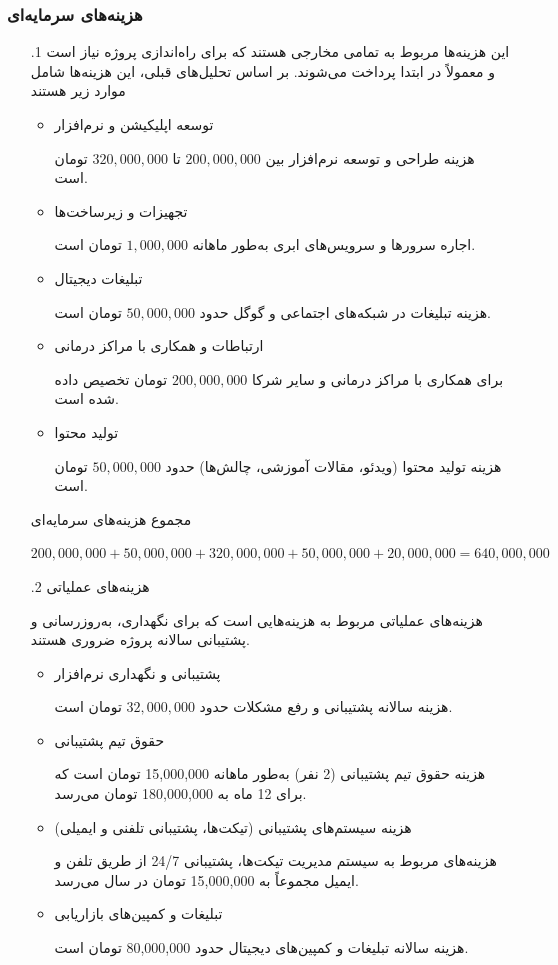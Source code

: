 \documentclass[dvipsnames, svgnames, x11names, 11pt]{article}
\begin{document}
\subsubsection{هزینه‌های سرمایه‌ای }
\begin{enumerate}
\item[\thesubsubsection.1]
این هزینه‌ها مربوط به تمامی مخارجی هستند که برای راه‌اندازی پروژه نیاز است و معمولاً در ابتدا پرداخت می‌شوند. بر اساس تحلیل‌های قبلی، این هزینه‌ها شامل موارد زیر هستند
\begin{itemize}
\item 
توسعه اپلیکیشن و نرم‌افزار

هزینه طراحی و توسعه نرم‌افزار بین
$200,000,000$
تا
$320,000,000$
تومان است.

\item 
تجهیزات و زیرساخت‌ها

اجاره سرورها و سرویس‌های ابری به‌طور ماهانه $1,000,000$ تومان است.

\item 
تبلیغات دیجیتال

هزینه تبلیغات در شبکه‌های اجتماعی و گوگل حدود $50,000,000$ تومان است.

\item 
ارتباطات و همکاری با مراکز درمانی

برای همکاری با مراکز درمانی و سایر شرکا
$200,000,000$
تومان تخصیص داده شده است.

\item 
تولید محتوا

هزینه تولید محتوا (ویدئو، مقالات آموزشی، چالش‌ها) حدود
$50,000,000$
تومان است.
\end{itemize}
مجموع هزینه‌های سرمایه‌ای

$200,000,000+50,000,000+320,000,000+50,000,000+20,000,000=640,000,000$

\item[\thesubsubsection.2]
هزینه‌های عملیاتی 

هزینه‌های عملیاتی مربوط به هزینه‌هایی است که برای نگهداری، به‌روزرسانی و پشتیبانی سالانه پروژه ضروری هستند.
\begin{itemize}
\item 
پشتیبانی و نگهداری نرم‌افزار

هزینه سالانه پشتیبانی و رفع مشکلات حدود $32,000,000$ تومان است.

\item 
حقوق تیم پشتیبانی

هزینه حقوق تیم پشتیبانی (2 نفر) به‌طور ماهانه 15,000,000 تومان است که برای 12 ماه به 180,000,000 تومان می‌رسد.

\item 
هزینه سیستم‌های پشتیبانی (تیکت‌ها، پشتیبانی تلفنی و ایمیلی)

هزینه‌های مربوط به سیستم مدیریت تیکت‌ها، پشتیبانی 24/7 از طریق تلفن و ایمیل مجموعاً به 15,000,000 تومان در سال می‌رسد.

\item 
تبلیغات و کمپین‌های بازاریابی

هزینه سالانه تبلیغات و کمپین‌های دیجیتال حدود 80,000,000 تومان است.
\end{itemize}
\end{enumerate}
\end{document}

